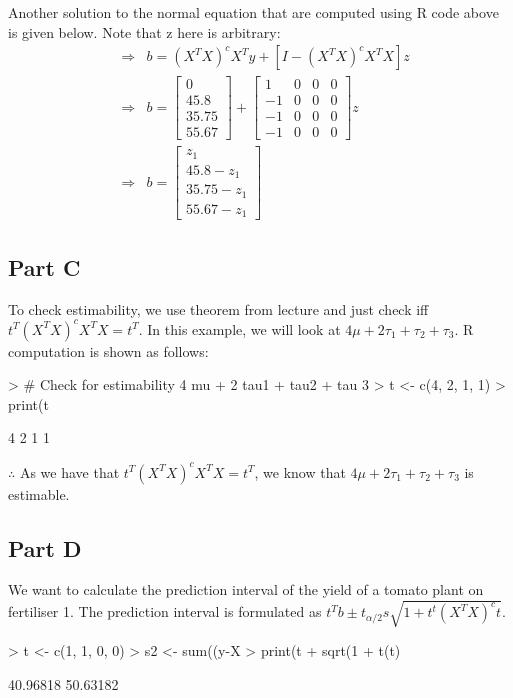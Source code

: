 \documentclass{article}
\begin{document}
\noindent Another solution to the normal equation that are computed using R code above is given below. Note that z here is arbitrary:
\begin{eqnarray*}
&\Rightarrow& b = (X^TX)^cX^Ty + [I-(X^TX)^cX^TX]z \\
&\Rightarrow& b = \begin{bmatrix} 0 \\ 45.8 \\ 35.75 \\ 55.67 \end{bmatrix} + \begin{bmatrix} 1 & 0 & 0 & 0 \\ -1 &0 &0 &0 \\ -1 &0 &0 &0 \\ -1 &0 &0 &0  \end{bmatrix}z \\
&\Rightarrow& b = \begin{bmatrix} z_1 \\ 45.8-z_1 \\ 35.75-z_1 \\ 55.67-z_1 \end{bmatrix}
\end{eqnarray*}

\subsection{Part C}
To check estimability, we use theorem from lecture and just check iff $t^T(X^TX)^cX^TX = t^T$. In this example, we will look at $4 \mu + 2 \tau_1 + \tau_2 + \tau_3$. R computation is shown as follows:
\begin{Schunk}
\begin{Sinput}
> # Check for estimability 4 mu + 2 tau1 + tau2 + tau 3
> t <- c(4, 2, 1, 1)
> print(t %
\end{Sinput}
\begin{Soutput}
     [,1] [,2] [,3] [,4]
[1,]    4    2    1    1
\end{Soutput}
\end{Schunk}

\noindent $\therefore$ As we have that $t^T(X^TX)^cX^TX = t^T$, we know that $4 \mu + 2 \tau_1 + \tau_2 + \tau_3$ is estimable.

\subsection{Part D}
We want to calculate the prediction interval of the yield of a tomato plant on fertiliser 1. The prediction interval is formulated as $t^Tb \pm t_{\alpha/2} s \sqrt{1+t^t(X^TX)^ct}$.
\begin{Schunk}
\begin{Sinput}
> t <- c(1, 1, 0, 0)
> s2 <- sum((y-X%
> print(t %
+         sqrt(1 + t(t) %
\end{Sinput}
\begin{Soutput}
[1] 40.96818 50.63182
\end{Soutput}
\end{Schunk}
\end{document}
